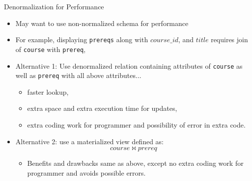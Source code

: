 \documentclass{beamer}
\begin{document}
\begin{frame}{Denormalization for Performance}
    \begin{itemize}
        \item May want to use non-normalized schema for performance
        \item For example, displaying \texttt{prereqs} along with $course\_id$, and $title$ requires join of \texttt{course} with \texttt{prereq},
        \item Alternative 1: Use denormalized relation containing attributes of \texttt{course} as well as \texttt{prereq} with all above attributes...
            \begin{itemize}
                \item faster lookup,
                \item extra space and extra execution time for updates,
                \item extra coding work for programmer and possibility of error in extra code.
            \end{itemize}
        \item Alternative 2: use a materialized view defined as:
            $$
                course \Join prereq
            $$
            \vspace{-5mm}
            \begin{itemize}
                \item Benefits and drawbacks same as above, except no extra coding work for programmer and avoids possible errors.
            \end{itemize}
    \end{itemize}
\end{frame}
\end{document}
